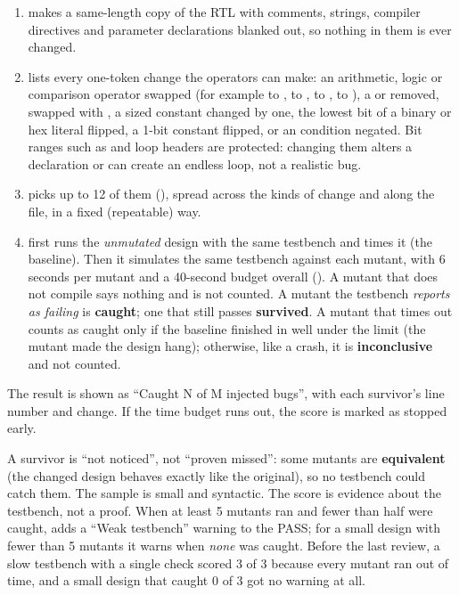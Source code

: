 \begin{enumerate}
  \item {} makes a same-length copy of the RTL with comments, strings, compiler directives and parameter declarations blanked out, so nothing in them is ever changed.
  \item {} lists every one-token change the operators can make: an arithmetic, logic or comparison operator swapped (for example \code{+} to \code{-}, \code{&} to \code{|}, \code{==} to \code{!=}, \code{<} to \code{<=}), a \code{~} or \code{!} removed,  swapped with , a sized constant changed by one, the lowest bit of a binary or hex literal flipped, a 1-bit constant flipped, or an  condition negated. Bit ranges such as \code{[WIDTH-1:0]} and loop headers are protected: changing them alters a declaration or can create an endless loop, not a realistic bug.
  \item {} picks up to 12 of them (), spread across the kinds of change and along the file, in a fixed (repeatable) way.
  \item {} first runs the \emph{unmutated} design with the same testbench and times it (the baseline). Then it simulates the same testbench against each mutant, with 6 seconds per mutant and a 40-second budget overall (). A mutant that does not compile says nothing and is not counted. A mutant the testbench \emph{reports as failing} is \textbf{caught}; one that still passes \textbf{survived}. A mutant that times out counts as caught only if the baseline finished in well under the limit (the mutant made the design hang); otherwise, like a crash, it is \textbf{inconclusive} and not counted.
\end{enumerate}

The result is shown as ``Caught N of M injected bugs'', with each survivor's line number and change. If the time budget runs out, the score is marked as stopped early.

\begin{warnbox}
A survivor is ``not noticed'', not ``proven missed'': some mutants are \textbf{equivalent} (the changed design behaves exactly like the original), so no testbench could catch them. The sample is small and syntactic. The score is evidence about the testbench, not a proof. When at least 5 mutants ran and fewer than half were caught,  adds a ``Weak testbench'' warning to the PASS; for a small design with fewer than 5 mutants it warns when \emph{none} was caught. Before the last review, a slow testbench with a single check scored 3 of 3 because every mutant ran out of time, and a small design that caught 0 of 3 got no warning at all.
\end{warnbox}

